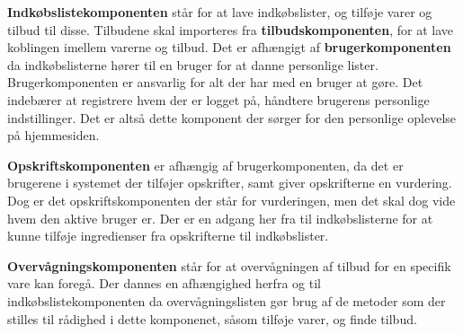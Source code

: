 \textbf{Indkøbslistekomponenten} står for at lave indkøbslister, og tilføje varer og tilbud til disse.
Tilbudene skal importeres fra \textbf{tilbudskomponenten}, for at lave koblingen imellem varerne og tilbud.
Det er afhængigt af \textbf{brugerkomponenten} da indkøbslisterne hører til en bruger for at danne personlige lister. Brugerkomponenten er ansvarlig for alt der har med en bruger at gøre. Det indebærer at registrere hvem der er logget på, håndtere brugerens personlige indstillinger. Det er altså dette komponent der sørger for den personlige oplevelse på hjemmesiden.

\textbf{Opskriftskomponenten} er afhængig af brugerkomponenten, da det er brugerene i systemet der tilføjer opskrifter, samt giver opskrifterne en vurdering.
Dog er det opskriftskomponenten der står for vurderingen, men det skal dog vide hvem den aktive bruger er.
Der er en adgang her fra til indkøbslisterne for at kunne tilføje ingredienser fra opskrifterne til indkøbslister.

\textbf{Overvågningskomponenten} står for at overvågningen af tilbud for en specifik vare kan foregå.
Der dannes en afhængighed herfra og til indkøbslistekomponenten da overvågningslisten gør brug af de metoder som der stilles til rådighed i dette komponenet, såsom tilføje varer, og finde tilbud.


